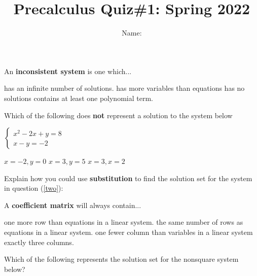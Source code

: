 \documentclass{exam}
\title{Precalculus Quiz\#1: Spring 2022  }
\author{  Name:   }
\begin{document}
\maketitle
\thispagestyle{empty}

\begin{questions}
\question 

\begin{multicols}{2}
An \textbf{inconsistent system} is one  which... 

\columnbreak
\begin{choices}
\choice has an infinite number of solutions.
\choice has more variables than equations
\choice has no solutions
\choice contains at least one polynomial term.
\end{choices}

\end{multicols}

\question 
\label{two}
\begin{multicols}{2}
Which of the following does \textbf{not} represent a solution to the system below

$
\begin{cases}
x^2 -2x + y = 8 \\
x - y = -2
\end{cases}
$

\begin{choices}
\choice  $x = -2, y = 0$
\choice $x = 3, y = 5$
\choice $x = 3, x = 2 $
\end{choices}
\end{multicols}

\question Explain how you could use \textbf{substitution} to find the solution set for the system in question (\ref{two}):

\makeemptybox{2in}
\question
\begin{multicols}{2}
A \textbf{coefficient matrix} will always contain...

\columnbreak

\begin{choices}
\choice one more row than equations in a linear system.
\choice the same number of rows as equations in a linear system.
\choice one fewer column than variables in a linear system
\choice  exactly three columns.
\end{choices}
\end{multicols}

\question


\begin{multicols}{2}
 Which of the following represents the solution set for the  nonsquare system below?


\end{multicols}
\end{questions}
\end{document}
